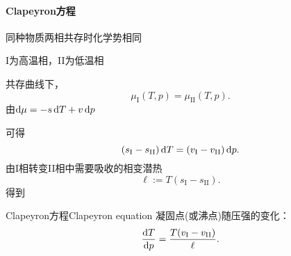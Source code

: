\paragraph*{Clapeyron方程}
同种物质两相共存时化学势相同
\begin{center}
	\tikzchap   I为高温相，II为低温相
\end{center}
共存曲线下，
\[
	\mu_\mathrm I(T,p)=\mu_\mathrm{II}(T,p).
\]
由$\mathop{}\!\mathrm{d}\mu=-s\mathop{}\!\mathrm{d} T+v\mathop{}\!\mathrm{d} p$
\iffalse
	故
	\[
		\pv{\mu_\mathrm I}T\d T+\pv{\mu_\mathrm I}p\d p=\pv{\mu_\mathrm{II}}T\d T+\pv{\mu_\mathrm{II}}p\d p.
	\]
	由Gibbs自由能给出Maxwell关系
	\begin{align*}
		\pw GTN=\pw GNT & \thus\kh{\pv\mu{T}}_N=-\kh{\pv SN}_T=-s, \\
		\pw GpN=\pw GNp & \thus\kh{\pv\mu{p}}_N=\kh{\pv VN}_p=v.
	\end{align*}
\fi
可得
\[
	\left(s_\mathrm I-s_\mathrm{II}\right)\mathop{}\!\mathrm{d} T=\left(v_\mathrm I-v_\mathrm{II}\right)\mathop{}\!\mathrm{d} p.
\]
由I相转变II相中需要吸收的相变潜热
\[
	\ell:=T(s_\mathrm I-s_\mathrm{II}).
\]
得到\begin{theorem}{Clapeyron方程}{Clapeyron equation}
	凝固点(或沸点)随压强的变化：
	\begin{equation}
		\frac{\mathrm{d}^{\;\!\!}T}{\mathrm{d} p^{\;\!\!}}=\frac{T(v_\mathrm I-v_\mathrm{II})}\ell.
	\end{equation}
\end{theorem}
